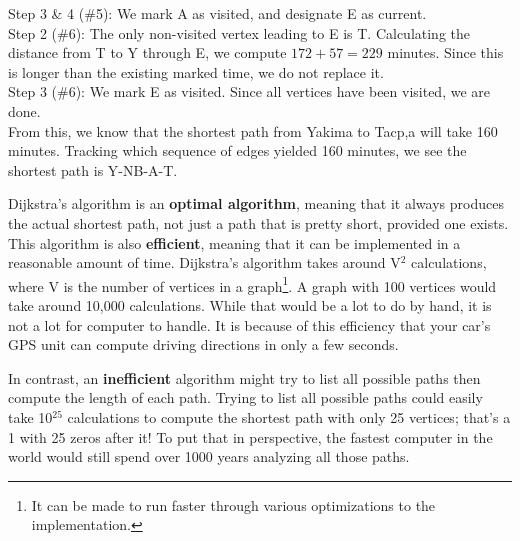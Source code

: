 \begin{example}{}{}
\noindent Step 3 \& 4 (\#5):  We mark A as visited, and designate E as current.\\

\noindent Step 2 (\#6):  The only non-visited vertex leading to E is T.  Calculating the distance from T to Y through E, we compute $172+57 = 229$ minutes.  Since this is longer than the existing marked time, we do not replace it.  \\

\noindent Step 3 (\#6):  We mark E as visited.  Since all vertices have been visited, we are done.  \\

From this, we know that the shortest path from Yakima to Tacp,a will take 160 minutes.  Tracking which sequence of edges yielded 160 minutes, we see the shortest path is Y-NB-A-T. 
\end{example}

Dijkstra's algorithm is an \textbf{optimal algorithm}, meaning that it always produces the actual shortest path, not just a path that is pretty short, provided one exists.  This algorithm is also \textbf{efficient}, meaning that it can be implemented in a reasonable amount of time.  Dijkstra's algorithm takes around V$^2$ calculations, where V is the number of vertices in a graph\footnote{It can be made to run faster through various optimizations to the implementation.}.  A graph with 100 vertices would take around 10,000 calculations.  While that would be a lot to do by hand, it is not a lot for computer to handle.  It is because of this efficiency that your car's GPS unit can compute driving directions in only a few seconds.  
 
In contrast, an \textbf{inefficient} algorithm might try to list all possible paths then compute the length of each path.  Trying to list all possible paths could easily take 10$^{25}$ calculations to compute the shortest path with only 25 vertices; that's a 1 with 25 zeros after it!  To put that in perspective, the fastest computer in the world would still spend over 1000 years analyzing all those paths.


